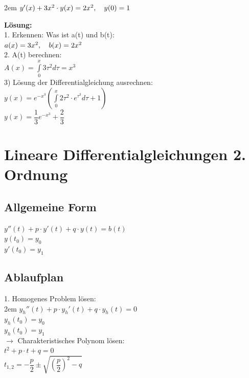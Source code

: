 \documentclass[11pt,final]{scrreprt}
\newcommand{\br} {\medskip\\}
\begin{document}
\begingroup
\leftskip2em 
$ y'(x)+3x^2\cdot y(x) = 2x^2, \hspace*{1em} y(0)=1 $\\
\par	
\endgroup 
\textbf{Lösung:}\br
1. Erkennen: Was ist a(t) und b(t):\\
\hspace*{2em}$ a(x) = 3x^2 , \hspace*{1em}b(x) = 2x^2 $\\
2. A(t) berechnen:\\
\hspace*{2em}$ A(x) = \int\limits_0^x 3\tau^2 d\tau = x^3 $\\
3) Lösung der Differentialgleichung ausrechnen:\\
\hspace*{2em}$ y(x) = e^{-x^3}\left( \int\limits_0^x 2\tau^2\cdot e^{\tau^3} d\tau + 1 \right)$\\
\hspace*{2em}$ y(x) =  \dfrac{1}{3}e^{-x^3}+\dfrac{2}{3}$\\


\newpage
\section{Lineare Differentialgleichungen 2. Ordnung}

\subsection*{Allgemeine Form}
$ y''(t)+p\cdot y'(t) + q \cdot y(t) = b(t) $\\
$ y(t_0) = y_0 $\\
$ y'(t_0) = y_1 $

\subsection*{Ablaufplan}

1. Homogenes Problem lösen:\\

\begingroup
\leftskip2em 
$ y_{h}''(t)+p\cdot y_{h}'(t) + q \cdot y_{h}(t) = 0 $\\
$ y_{h}(t_0) = y_0 $\\
$ y_{h}(t_0) = y_1$\br
$\rightarrow$ Charakteristisches Polynom lösen:\\
$ t^2+p\cdot t + q = 0 $\\
$ t_{1,2}=-\dfrac{p}{2} \pm \sqrt{(\dfrac{p}{2})^2 -q} $\br
\end{document}

